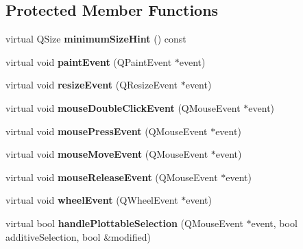 \subsection*{Protected Member Functions}
\begin{DoxyCompactItemize}
\item 
\hypertarget{classQCustomPlot_a4904f06d831afae29cd5d10e889388c3}{virtual Q\-Size {\bfseries minimum\-Size\-Hint} () const }\label{classQCustomPlot_a4904f06d831afae29cd5d10e889388c3}

\item 
\hypertarget{classQCustomPlot_a2bbc3b1c24bfcc8a7cc1f3008cdd9b73}{virtual void {\bfseries paint\-Event} (Q\-Paint\-Event $\ast$event)}\label{classQCustomPlot_a2bbc3b1c24bfcc8a7cc1f3008cdd9b73}

\item 
\hypertarget{classQCustomPlot_a13e05523a40c3f08875df5cde85cf0d9}{virtual void {\bfseries resize\-Event} (Q\-Resize\-Event $\ast$event)}\label{classQCustomPlot_a13e05523a40c3f08875df5cde85cf0d9}

\item 
\hypertarget{classQCustomPlot_a77591913a5b543bdc465dd5e08325a49}{virtual void {\bfseries mouse\-Double\-Click\-Event} (Q\-Mouse\-Event $\ast$event)}\label{classQCustomPlot_a77591913a5b543bdc465dd5e08325a49}

\item 
\hypertarget{classQCustomPlot_abce84fa2c71e47b9295d67e8fce84bb4}{virtual void {\bfseries mouse\-Press\-Event} (Q\-Mouse\-Event $\ast$event)}\label{classQCustomPlot_abce84fa2c71e47b9295d67e8fce84bb4}

\item 
\hypertarget{classQCustomPlot_ac64727a4f442770f6e5e6be2d0530843}{virtual void {\bfseries mouse\-Move\-Event} (Q\-Mouse\-Event $\ast$event)}\label{classQCustomPlot_ac64727a4f442770f6e5e6be2d0530843}

\item 
\hypertarget{classQCustomPlot_a724e97d2e8c03e68adac5f4b6164a1b3}{virtual void {\bfseries mouse\-Release\-Event} (Q\-Mouse\-Event $\ast$event)}\label{classQCustomPlot_a724e97d2e8c03e68adac5f4b6164a1b3}

\item 
\hypertarget{classQCustomPlot_a7b8bd7e8d3a1d23a8595e9c6a6b76ef1}{virtual void {\bfseries wheel\-Event} (Q\-Wheel\-Event $\ast$event)}\label{classQCustomPlot_a7b8bd7e8d3a1d23a8595e9c6a6b76ef1}

\item 
\hypertarget{classQCustomPlot_a881c8652ebb912345de27687817845cf}{virtual bool {\bfseries handle\-Plottable\-Selection} (Q\-Mouse\-Event $\ast$event, bool additive\-Selection, bool \&modified)}\label{classQCustomPlot_a881c8652ebb912345de27687817845cf}


\end{DoxyCompactItemize}
